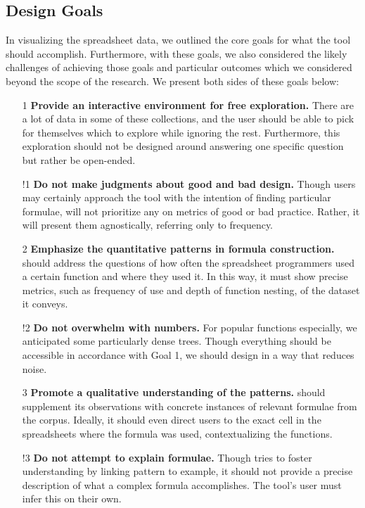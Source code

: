 \documentclass[conference]{IEEEtran}
\begin{document}
	\subsection{Design Goals} \label{goals} In visualizing the spreadsheet data, we
	outlined the core goals for what the tool should accomplish. Furthermore, with
	these goals, we also considered the likely challenges of achieving those goals
	and particular outcomes which we considered beyond the scope of the research.
	We present both sides of these goals below:
	
	\begin{itemize}
		
		\item [1] \textbf{Provide an interactive environment for free exploration.}
		There are a lot of data in some of these collections, and the user should be
		able to pick for themselves which to explore while ignoring the rest.
		Furthermore, this exploration should not be designed around answering one
		specific question but rather be open-ended.
		
		\item [!1] \textbf{Do not make judgments about good and bad design.} Though
		users may certainly approach the tool with the intention of finding particular
		formulae, \toolname will not prioritize any on metrics of good or bad
		practice. Rather, it will present them agnostically, referring only to
		frequency.
		
		\item [2] \textbf{Emphasize the quantitative patterns in formula
			construction.} \toolname should address the questions of how often the
		spreadsheet programmers used a certain function and where they used it. In
		this way, it must show precise metrics, such as frequency of use and depth of
		function nesting, of the dataset it conveys.
		
		\item [!2] \textbf{Do not overwhelm with numbers.} For popular functions
		especially, we anticipated some particularly dense trees. Though everything
		should be accessible in accordance with Goal 1, we should design in a way that
		reduces noise.
		
		\item [3] \textbf{Promote a qualitative understanding of the patterns.}
		\toolname should supplement its observations with concrete instances of
		relevant formulae from the corpus. Ideally, it should even direct users to the
		exact cell in the spreadsheets where the formula was used, contextualizing the
		functions.
		
		\item [!3] \textbf{Do not attempt to explain formulae.} Though \toolname tries
		to foster understanding by linking pattern to example, it should not provide a
		precise description of what a complex formula accomplishes. The tool's user
		must infer this on their own.
		
	\end{itemize}
	
\end{document}
